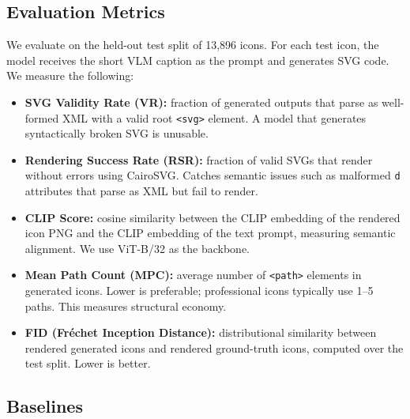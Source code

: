 

\subsection{Evaluation Metrics}

We evaluate on the held-out test split of 13,896 icons. For each test icon,
the model receives the short VLM caption as the prompt and generates SVG code.
We measure the following:

\begin{itemize}
    \item \textbf{SVG Validity Rate (VR):} fraction of generated outputs that
          parse as well-formed XML with a valid root \texttt{<svg>} element.
          A model that generates syntactically broken SVG is unusable.

    \item \textbf{Rendering Success Rate (RSR):} fraction of valid SVGs that
          render without errors using CairoSVG. Catches semantic issues such
          as malformed \texttt{d} attributes that parse as XML but fail to render.

    \item \textbf{CLIP Score:} cosine similarity between the CLIP \citep{radford2021clip}
          embedding of the rendered icon PNG and the CLIP embedding of the
          text prompt, measuring semantic alignment. We use
          ViT-B/32 \citep{radford2021clip} as the backbone.

    \item \textbf{Mean Path Count (MPC):} average number of \texttt{<path>}
          elements in generated icons. Lower is preferable; professional icons
          typically use 1--5 paths. This measures structural economy.

    \item \textbf{FID (Fréchet Inception Distance):} distributional similarity
          between rendered generated icons and rendered ground-truth icons,
          computed over the test split. Lower is better.
\end{itemize}

\subsection{Baselines}

